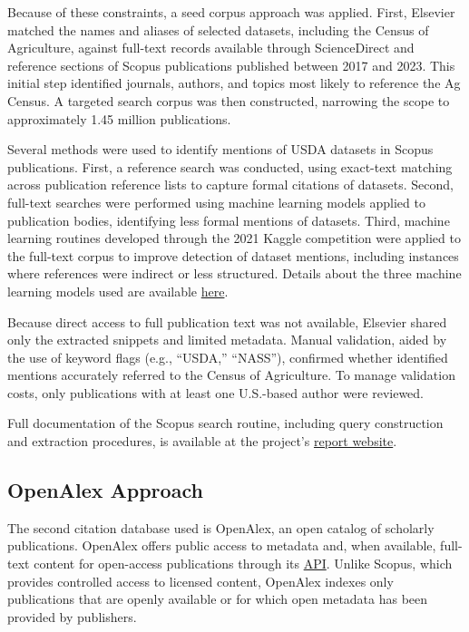 \documentclass[
  letterpaper,
  DIV=11,
  numbers=noendperiod]{scrartcl}
\begin{document}
Because of these constraints, a seed corpus approach was applied. First,
Elsevier matched the names and aliases of selected datasets, including
the Census of Agriculture, against full-text records available through
ScienceDirect and reference sections of Scopus publications published
between 2017 and 2023. This initial step identified journals, authors,
and topics most likely to reference the Ag Census. A targeted search
corpus was then constructed, narrowing the scope to approximately 1.45
million publications.

Several methods were used to identify mentions of USDA datasets in
Scopus publications. First, a reference search was conducted, using
exact-text matching across publication reference lists to capture formal
citations of datasets. Second, full-text searches were performed using
machine learning models applied to publication bodies, identifying less
formal mentions of datasets. Third, machine learning routines developed
through the 2021 Kaggle competition were applied to the full-text corpus
to improve detection of dataset mentions, including instances where
references were indirect or less structured. Details about the three
machine learning models used are available
\href{https://github.com/democratizingdata/democratizingdata-ml-algorithms/blob/main/README.md}{here}.

Because direct access to full publication text was not available,
Elsevier shared only the extracted snippets and limited metadata. Manual
validation, aided by the use of keyword flags (e.g., ``USDA,''
``NASS''), confirmed whether identified mentions accurately referred to
the Census of Agriculture. To manage validation costs, only publications
with at least one U.S.-based author were reviewed.

Full documentation of the Scopus search routine, including query
construction and extraction procedures, is available at the project's
\href{https://laurenchenarides.github.io/compare_scopus_openalex_report/workflow/step02_01/extract_dataset_mentions.html}{report
website}.

\subsection{OpenAlex Approach}\label{openalex-approach}

The second citation database used is OpenAlex, an open catalog of
scholarly publications. OpenAlex offers public access to metadata and,
when available, full-text content for open-access publications through
its
\href{https://docs.openalex.org/how-to-use-the-api/api-overview}{API}.
Unlike Scopus, which provides controlled access to licensed content,
OpenAlex indexes only publications that are openly available or for
which open metadata has been provided by publishers.
\end{document}
